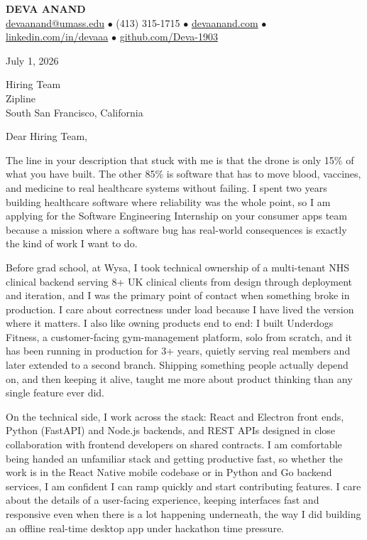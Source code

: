 \documentclass[letterpaper,11pt]{article}
\begin{document}
\begin{center}
    {\fontsize{18}{20}\selectfont\bfseries DEVA ANAND}\\ \vspace{3pt}
    {\small
    \href{mailto:devaanand@umass.edu}{devaanand@umass.edu}
    \enspace$\bullet$\enspace
    (413) 315-1715
    \enspace$\bullet$\enspace
    \href{https://devaanand.com}{devaanand.com}
    \enspace$\bullet$\enspace
    \href{https://linkedin.com/in/devaaa/}{linkedin.com/in/devaaa}
    \enspace$\bullet$\enspace
    \href{https://github.com/Deva-1903}{github.com/Deva-1903}}
\end{center}

\vspace{6pt}

July 1, 2026

Hiring Team \\
Zipline \\
South San Francisco, California

\vspace{2pt}

Dear Hiring Team,

The line in your description that stuck with me is that the drone is only 15\% of what you have built. The other 85\% is software that has to move blood, vaccines, and medicine to real healthcare systems without failing. I spent two years building healthcare software where reliability was the whole point, so I am applying for the Software Engineering Internship on your consumer apps team because a mission where a software bug has real-world consequences is exactly the kind of work I want to do.

Before grad school, at Wysa, I took technical ownership of a multi-tenant NHS clinical backend serving 8+ UK clinical clients from design through deployment and iteration, and I was the primary point of contact when something broke in production. I care about correctness under load because I have lived the version where it matters. I also like owning products end to end: I built Underdogs Fitness, a customer-facing gym-management platform, solo from scratch, and it has been running in production for 3+ years, quietly serving real members and later extended to a second branch. Shipping something people actually depend on, and then keeping it alive, taught me more about product thinking than any single feature ever did.

On the technical side, I work across the stack: React and Electron front ends, Python (FastAPI) and Node.js backends, and REST APIs designed in close collaboration with frontend developers on shared contracts. I am comfortable being handed an unfamiliar stack and getting productive fast, so whether the work is in the React Native mobile codebase or in Python and Go backend services, I am confident I can ramp quickly and start contributing features. I care about the details of a user-facing experience, keeping interfaces fast and responsive even when there is a lot happening underneath, the way I did building an offline real-time desktop app under hackathon time pressure.
\end{document}
